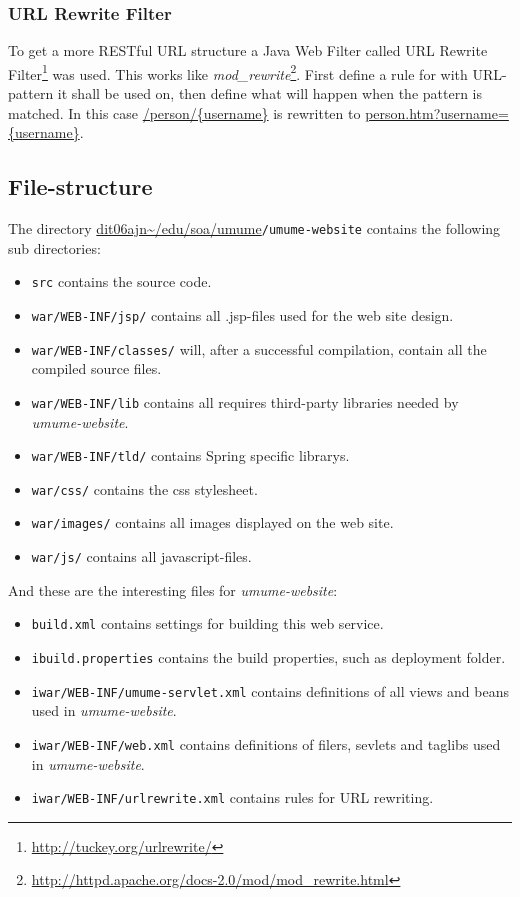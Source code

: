 \documentclass[titlepage, twocolumn, a4paper, 10pt]{article}
\def\pathtocode{\url{dit06ajn~/edu/soa/umume}}
\begin{document}
\subsubsection{URL Rewrite Filter}\label{sec:urlfilter}
To get a more RESTful URL structure a Java Web Filter called URL
Rewrite Filter\footnote{\url{http://tuckey.org/urlrewrite/}} was
used. This works like
\textit{mod\_rewrite}\footnote{\url{http://httpd.apache.org/docs-2.0/mod/mod_rewrite.html}}.
First define a rule for with URL-pattern it shall be used on, then
define what will happen when the pattern is matched. In this case
\url{/person/{username}} is rewritten to
\url{person.htm?username={username}}.

\subsection{File-structure}\label{sec:filestructureweb}
The directory \pathtocode\texttt{/umume-website} contains the
following sub directories:
\begin{itemize}
\item \verb!src! contains the source code.
\item \verb!war/WEB-INF/jsp/! contains all .jsp-files used for the web site design.
\item \verb!war/WEB-INF/classes/! will, after a successful compilation,
  contain all the compiled source files.
\item \verb!war/WEB-INF/lib! contains all requires third-party libraries
  needed by \textit{umume-website}.
\item \verb!war/WEB-INF/tld/! contains Spring specific librarys.
\item \verb!war/css/! contains the css stylesheet.
\item \verb!war/images/! contains all images displayed on the web site.
\item \verb!war/js/! contains all javascript-files.
\end{itemize}

And these are the interesting files for \textit{umume-website}:
\begin{itemize}
\item \verb!build.xml! contains settings for building this web
  service.
\item \verb!ibuild.properties! contains the build properties, such as
  deployment folder.
\item \verb!iwar/WEB-INF/umume-servlet.xml! contains definitions of
  all views and beans used in \textit{umume-website}.
\item \verb!iwar/WEB-INF/web.xml! contains definitions of filers, sevlets and
  taglibs used in \textit{umume-website}.
\item \verb!iwar/WEB-INF/urlrewrite.xml! contains rules for URL rewriting.
\end{itemize}
\end{document}
